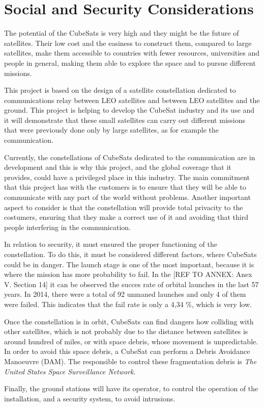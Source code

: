 \chapter{Social and Security Considerations}
The potential of the CubeSats is very high and they might be the future of satellites. Their low cost and the easiness to construct them, compared to large satellites, make them accessible to countries with fewer resources, universities and people in general, making them able to explore the space and to pursue different missions.

This project is based on the design of a satellite constellation dedicated to communications relay between LEO satellites and between LEO satellites and the ground. This project is helping to develop the CubeSat industry and its use and it will demonstrate that these small satellites can carry out different missions that were previously done only by large satellites, as for example the communication.

Currently, the constellations of CubeSats dedicated to the communication are in development and this is why this project, and the global coverage that it provides, could have a privileged place in this industry. The main commitment that this project has with the customers is to ensure that they will be able to communicate with any part of the world without problems. Another important aspect to consider is that the constellation will provide total privacity  to the costumers, ensuring that they make a correct use of it and avoiding that third people interfering in the communication. 

In relation to security, it must ensured the proper functioning of the constellation. To do this, it must be considered different factors, where CubeSats could be in danger. The launch stage is one of the most important, because it is where the mission has more probability to fail. In the [{REF TO ANNEX: Anex V. Section 14}] it can be observed the succes rate of orbital launches in the last 57 years. In 2014, there were a total of 92 unmaned launches and only 4 of them were failed. This indicates that the fail rate is only a 4,34 \%, which is very low. 

Once the constellation is in orbit, CubeSats can find dangers how colliding with other satellites, which is not probably due to the distance between satellites is around hundred of miles, or with space debris, whose movement is unpredictable. In order to avoid this space debris, a CubeSat can perform a Debris Avoidance Manoeuvre (DAM). The responsible to control these fragmentation debris is \textit{The United States Space Surveillance Network}.

Finally, the ground stations will have its operator, to control the operation of the installation, and a security system, to avoid intrusions.